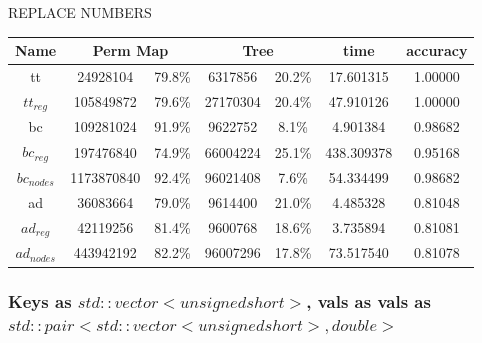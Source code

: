 \documentclass[]{article}
\theoremstyle{definition}
\begin{document}
REPLACE NUMBERS

\begin{center}
\begin{tabular} { |c|c|c|c|c|c|c| }
\hline
Name & \multicolumn{2}{c|}{Perm Map} & \multicolumn{2}{c|}{Tree} & time & accuracy \\
\hline
tt & 24928104 & 79.8\%  & 6317856 & 20.2\% & 17.601315 & 1.00000 \\

$tt_{reg}$ & 105849872 & 79.6\% & 27170304 & 20.4\% & 47.910126 & 1.00000 \\

bc &109281024 & 91.9\% & 9622752 & 8.1\% & 4.901384 & 0.98682 \\

$bc_{reg}$ & 197476840 & 74.9\% & 66004224 & 25.1\% & 438.309378 & 0.95168 \\

$bc_{nodes}$ & 1173870840 & 92.4\% & 96021408 & 7.6\% & 54.334499 & 0.98682 \\

ad & 36083664 & 79.0\% & 9614400 & 21.0\% & 4.485328 & 0.81048 \\

$ad_{reg}$ & 42119256 & 81.4\% & 9600768 & 18.6\% & 3.735894 & 0.81081 \\

$ad_{nodes}$ & 443942192 & 82.2\% & 96007296 & 17.8\% & 73.517540 & 0.81078 \\
\hline
\end{tabular}
\end{center}

\subsubsection{Keys as $std::vector<unsigned short>$, vals as vals as $std::pair<std::vector<unsigned short>, double>$}
\end{document}
